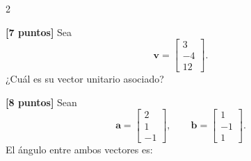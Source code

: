\documentclass[10pt]{article}
\begin{document}
    \begin{multicols}{2}
        \raggedcolumns

        \begin{question}
            \textbf{[7 puntos]} Sea
            \[
            \mathbf{v}=\begin{bmatrix}3\\-4\\12\end{bmatrix}.
            \]
            ¿Cuál es su vector unitario asociado?

            \begin{inlineanswers}
            \end{inlineanswers}
        \end{question}


        \begin{question}
            \textbf{[8 puntos]} Sean
            \[
            \mathbf{a}=\begin{bmatrix}2\\1\\-1\end{bmatrix},
            \qquad
            \mathbf{b}=\begin{bmatrix}1\\-1\\1\end{bmatrix}.
            \]
            El ángulo entre ambos vectores es:


\end{question}
\end{multicols}
\end{document}
